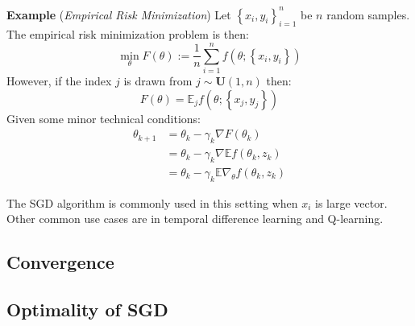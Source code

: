 \textbf{Example} (\textit{Empirical Risk Minimization}) Let $\left\{x_i, y_i\right\}_{i=1}^n$ be $n$ random samples. The empirical risk minimization problem is then:
\begin{equation}
	\min_{\theta} F(\theta) := \frac{1}{n} \sum_{i=1}^n f(\theta; \left\{x_i, y_i\right\})
\end{equation}
However, if the index $j$ is drawn from $j \sim \mathbf{U}(1,n)$ then:
\begin{equation}
	F(\theta) = \mathbb{E}_j f(\theta; \left\{x_j, y_j\right\})
\end{equation}
Given some minor technical conditions:
\begin{align}
\theta_{k+1} &= \theta_k - \gamma_k \nabla F(\theta_k)\\
&= \theta_k - \gamma_k \nabla \mathbb{E}f(\theta_k, z_k)\\
&= \theta_k - \gamma_k \mathbb{E} \nabla_{\theta} f(\theta_k, z_k)
\end{align}

The SGD algorithm is commonly used in this setting when $x_i$ is large vector. Other common use cases are in temporal difference learning and Q-learning. 

\subsection{Convergence}

\subsection{Optimality of SGD}